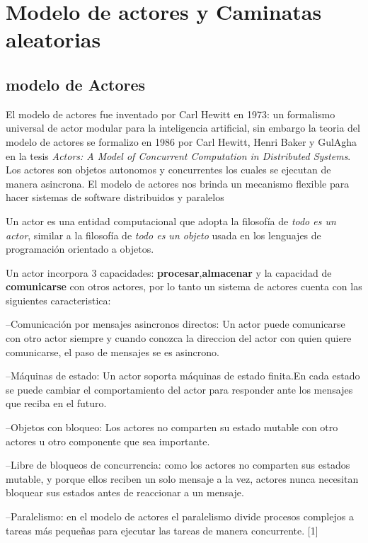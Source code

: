 \chapter{Modelo de actores y Caminatas aleatorias}

\section{modelo de Actores}


El modelo de actores fue inventado por Carl Hewitt  en 1973: un formalismo universal de actor modular para la inteligencia artificial, sin embargo la teoria del modelo de actores se formalizo en 1986 por Carl Hewitt, Henri Baker y GulAgha en la  tesis \emph{Actors: A Model of Concurrent Computation in Distributed Systems}. Los actores son objetos autonomos y concurrentes los cuales se ejecutan de manera asincrona. El modelo de actores  nos brinda un mecanismo flexible para  hacer sistemas de software  distribuidos y paralelos 

Un actor es una entidad computacional que adopta la filosof\'ia de \emph{todo es un actor}, similar a la filosof\'ia de \emph{todo es un objeto} usada en los lenguajes de programaci\'on orientado a objetos.


Un actor  incorpora 3 capacidades: \textbf{procesar},\textbf{almacenar} y   la capacidad de \textbf{comunicarse} con otros actores, por lo tanto un sistema de actores cuenta con las siguientes caracteristica:

--Comunicaci\'on por mensajes asincronos directos: Un actor puede comunicarse con otro actor siempre y cuando conozca la direccion del actor con quien quiere comunicarse, el paso de mensajes se es asincrono.


--M\'aquinas de estado: Un actor soporta m\'aquinas de estado finita.En cada estado  se puede cambiar el comportamiento del actor para responder ante los mensajes que reciba en el futuro. 

--Objetos con bloqueo: Los actores no comparten su estado mutable con otro actores u otro componente que sea importante.

--Libre de bloqueos de concurrencia: como los actores no comparten sus estados mutable, y porque ellos reciben un solo mensaje a la vez, actores nunca necesitan bloquear sus estados antes de reaccionar a un mensaje.

--Paralelismo: en el modelo de actores el paralelismo divide procesos complejos a tareas m\'as peque\~nas para ejecutar las tareas de manera concurrente. [1]



